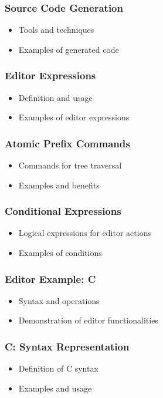 \documentclass[t,24pt,aspectratio=169]{beamer}
\begin{document}
\begin{frame}[hvid]
    \frametitle{Source Code Generation}
    \begin{itemize}
        \item Tools and techniques
        \item Examples of generated code
    \end{itemize}
\end{frame}

\begin{frame}[hvid]
    \frametitle{Editor Expressions}
    \begin{itemize}
        \item Definition and usage
        \item Examples of editor expressions
    \end{itemize}
\end{frame}

\begin{frame}[hvid]
    \frametitle{Atomic Prefix Commands}
    \begin{itemize}
        \item Commands for tree traversal
        \item Examples and benefits
    \end{itemize}
\end{frame}

\begin{frame}[hvid]
    \frametitle{Conditional Expressions}
    \begin{itemize}
        \item Logical expressions for editor actions
        \item Examples of conditions
    \end{itemize}
\end{frame}

\begin{frame}[hvid]
    \frametitle{Editor Example: C}
    \begin{itemize}
        \item Syntax and operations
        \item Demonstration of editor functionalities
    \end{itemize}
\end{frame}

\begin{frame}[hvid]
    \frametitle{C: Syntax Representation}
    \begin{itemize}
        \item Definition of C syntax
        \item Examples and usage
    \end{itemize}
\end{frame}
\end{document}
